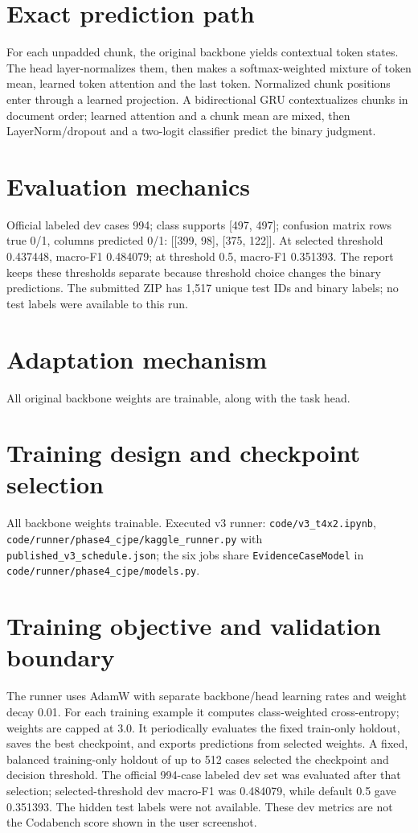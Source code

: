 \documentclass[11pt,a4paper]{article}
\begin{document}
\section{Exact prediction path}
For each unpadded chunk, the original backbone yields contextual token states. The head layer-normalizes them, then makes a softmax-weighted mixture of token mean, learned token attention and the last token. Normalized chunk positions enter through a learned projection. A bidirectional GRU contextualizes chunks in document order; learned attention and a chunk mean are mixed, then LayerNorm/dropout and a two-logit classifier predict the binary judgment.
\section{Evaluation mechanics}
Official labeled dev cases 994; class supports [497, 497]; confusion matrix rows true 0/1, columns predicted 0/1: [[399, 98], [375, 122]]. At selected threshold 0.437448, macro-F1 0.484079; at threshold 0.5, macro-F1 0.351393. The report keeps these thresholds separate because threshold choice changes the binary predictions. The submitted ZIP has 1,517 unique test IDs and binary labels; no test labels were available to this run.
\section{Adaptation mechanism}
All original backbone weights are trainable, along with the task head.
\section{Training design and checkpoint selection}
All backbone weights trainable. Executed v3 runner: \texttt{code/v3\_t4x2.ipynb}, \texttt{code/runner/phase4\_cjpe/kaggle\_runner.py} with \texttt{published\_v3\_schedule.json}; the six jobs share \texttt{EvidenceCaseModel} in \texttt{code/runner/phase4\_cjpe/models.py}.
\section{Training objective and validation boundary}
The runner uses AdamW with separate backbone/head learning rates and weight decay 0.01. For each training example it computes class-weighted cross-entropy; weights are capped at 3.0. It periodically evaluates the fixed train-only holdout, saves the best checkpoint, and exports predictions from selected weights. A fixed, balanced training-only holdout of up to 512 cases selected the checkpoint and decision threshold. The official 994-case labeled dev set was evaluated after that selection; selected-threshold dev macro-F1 was 0.484079, while default 0.5 gave 0.351393. The hidden test labels were not available. These dev metrics are not the Codabench score shown in the user screenshot.
\end{document}
